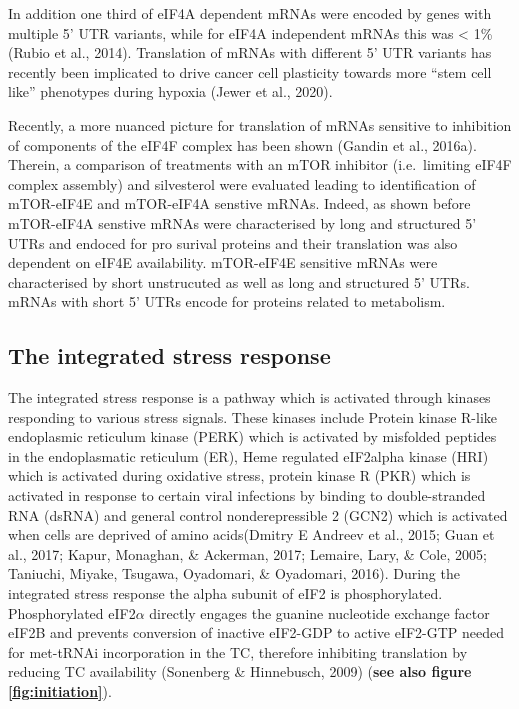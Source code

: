 \documentclass[12pt,openany]{book}
\begin{document}
In addition one third of eIF4A dependent mRNAs were encoded by genes
with multiple 5' UTR variants, while for eIF4A independent mRNAs this
was \textless{} 1\% (Rubio et al., 2014). Translation of mRNAs with
different 5' UTR variants has recently been implicated to drive cancer
cell plasticity towards more ``stem cell like'' phenotypes during
hypoxia (Jewer et al., 2020).

Recently, a more nuanced picture for translation of mRNAs sensitive to
inhibition of components of the eIF4F complex has been shown (Gandin et
al., 2016a). Therein, a comparison of treatments with an mTOR inhibitor
(i.e.~limiting eIF4F complex assembly) and silvesterol were evaluated
leading to identification of mTOR-eIF4E and mTOR-eIF4A senstive mRNAs.
Indeed, as shown before mTOR-eIF4A senstive mRNAs were characterised by
long and structured 5' UTRs and endoced for pro surival proteins and
their translation was also dependent on eIF4E availability. mTOR-eIF4E
sensitive mRNAs were characterised by short unstrucuted as well as long
and structured 5' UTRs. mRNAs with short 5' UTRs encode for proteins
related to metabolism.

\subsection{The integrated stress response}

The integrated stress response is a pathway which is activated through
kinases responding to various stress signals. These kinases include
Protein kinase R-like endoplasmic reticulum kinase (PERK) which is
activated by misfolded peptides in the endoplasmatic reticulum (ER),
Heme regulated eIF2alpha kinase (HRI) which is activated during
oxidative stress, protein kinase R (PKR) which is activated in response
to certain viral infections by binding to double-stranded RNA (dsRNA)
and general control nonderepressible 2 (GCN2) which is activated when
cells are deprived of amino acids(Dmitry E Andreev et al., 2015; Guan et
al., 2017; Kapur, Monaghan, \& Ackerman, 2017; Lemaire, Lary, \& Cole,
2005; Taniuchi, Miyake, Tsugawa, Oyadomari, \& Oyadomari, 2016). During
the integrated stress response the alpha subunit of eIF2 is
phosphorylated. Phosphorylated eIF2\(\alpha\) directly engages the
guanine nucleotide exchange factor eIF2B and prevents conversion of
inactive eIF2-GDP to active eIF2-GTP needed for met-tRNAi incorporation
in the TC, therefore inhibiting translation by reducing TC availability
(Sonenberg \& Hinnebusch, 2009) (\textbf{see also figure
\ref{fig:initiation}}).
\end{document}
